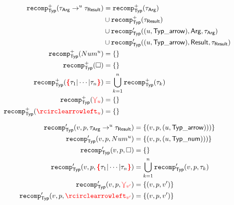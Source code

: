 
\begin{align*}
  \tRecompPlus{\arrowTyp{\tau_\ArrowArg}{u}{\tau_\ArrowResult}}
  &= \tRecompPlus{\tau_\ArrowArg} \\
  &\cup \tRecompPlus{\tau_\ArrowResult} \\
  &\cup \tRecompPrime{(u, \TypArrow)}{\ArrowArg}{\tau_\ArrowArg} \\
  &\cup \tRecompPrime{(u, \TypArrow)}{\ArrowResult}{\tau_\ArrowResult}
  \\
  \tRecompPlus{\numTyp{u}} &= \{\}
  \\
  \tRecompPlus{\hole} &= \{\}
  \\
  \tRecompPlus{\conflictHole{\tau_1 | \cdots | \tau_n}}
  &= \bigcup_{k=1}^n \tRecompPlus{\tau_k}
  \\
  \tRecompPlus{\multiVertex{u}} &= \{\}
  \\
  \tRecompPlus{\cycleVertex{u}} &= \{\}
\end{align*}

\begin{align*}
  \tRecompPrime{v}{p}{\arrowTyp{\tau_\ArrowArg}{u}{\tau_\ArrowResult}}
  &= \{(v, p, (u, \TypArrow)))\}
  \\
  \tRecompPrime{v}{p}{\numTyp{u}}
  &= \{(v, p, (u, \TypNum)))\}
  \\
  \tRecompPrime{v}{p}{\hole} &= \{\}
  \\
  \tRecompPrime{v}{p}{\conflictHole{\tau_1 | \cdots | \tau_n}}
  &= \bigcup_{k=1}^n \tRecompPrime{v}{p}{\tau_k}
  \\
  \tRecompPrime{v}{p}{\multiVertex{v'}}
  &= \{(v, p, v')\}
  \\
  \tRecompPrime{v}{p}{\cycleVertex{v'}}
  &= \{(v, p, v')\}
\end{align*}




